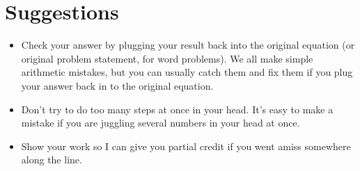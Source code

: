 \documentclass[letterpaper, landscape]{exam}
\begin{document}


   

  \section{Suggestions}

  \begin{itemize}
    \item Check your answer by plugging your result back into the original
      equation (or original problem statement, for word problems).  We all make
      simple arithmetic mistakes, but you can usually catch them and fix them if
      you plug your answer back in to the original equation.

    \item Don't try to do too many steps at once in your head.  It's easy to make
      a mistake if you are juggling several numbers in your head at once.

    \item Show your work so I can give you partial credit if you went amiss
      somewhere along the line.

  \end{itemize}
\end{document}
